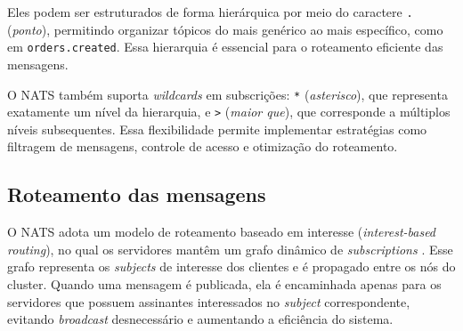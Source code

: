 Eles podem ser estruturados de forma hierárquica por meio do caractere \texttt{.} (\textit{ponto}), permitindo organizar tópicos do mais genérico ao mais específico, como em \texttt{orders.created}. Essa hierarquia é essencial para o roteamento eficiente das mensagens.

O NATS também suporta \textit{wildcards} em subscrições: \texttt{*} (\textit{asterisco}), que representa exatamente um nível da hierarquia, e \texttt{>} (\textit{maior que}), que corresponde a múltiplos níveis subsequentes. Essa flexibilidade permite implementar estratégias como filtragem de mensagens, controle de acesso e otimização do roteamento.

\subsection{Roteamento das mensagens}

O NATS adota um modelo de roteamento baseado em interesse (\textit{interest-based routing}), no qual os servidores mantêm um grafo dinâmico de \textit{subscriptions} \cite{nats_faq}. Esse grafo representa os \textit{subjects} de interesse dos clientes e é propagado entre os nós do cluster. Quando uma mensagem é publicada, ela é encaminhada apenas para os servidores que possuem assinantes interessados no \textit{subject} correspondente, evitando \textit{broadcast} desnecessário e aumentando a eficiência do sistema.

